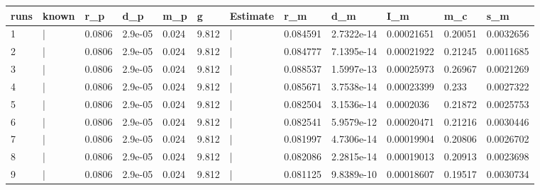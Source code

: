 \begin{tabular}{llllllllllll}
runs & known & r_p & d_p & m_p & g & Estimate & r_m & d_m & I_m & m_c & s_m \\ 
\hline 
1 & | & 0.0806 & 2.9e-05 & 0.024 & 9.812 & | & 0.084591 & 2.7322e-14 & 0.00021651 & 0.20051 & 0.0032656 \\ 
2 & | & 0.0806 & 2.9e-05 & 0.024 & 9.812 & | & 0.084777 & 7.1395e-14 & 0.00021922 & 0.21245 & 0.0011685 \\ 
3 & | & 0.0806 & 2.9e-05 & 0.024 & 9.812 & | & 0.088537 & 1.5997e-13 & 0.00025973 & 0.26967 & 0.0021269 \\ 
4 & | & 0.0806 & 2.9e-05 & 0.024 & 9.812 & | & 0.085671 & 3.7538e-14 & 0.00023399 & 0.233 & 0.0027322 \\ 
5 & | & 0.0806 & 2.9e-05 & 0.024 & 9.812 & | & 0.082504 & 3.1536e-14 & 0.0002036 & 0.21872 & 0.0025753 \\ 
6 & | & 0.0806 & 2.9e-05 & 0.024 & 9.812 & | & 0.082541 & 5.9579e-12 & 0.00020471 & 0.21216 & 0.0030446 \\ 
7 & | & 0.0806 & 2.9e-05 & 0.024 & 9.812 & | & 0.081997 & 4.7306e-14 & 0.00019904 & 0.20806 & 0.0026702 \\ 
8 & | & 0.0806 & 2.9e-05 & 0.024 & 9.812 & | & 0.082086 & 2.2815e-14 & 0.00019013 & 0.20913 & 0.0023698 \\ 
9 & | & 0.0806 & 2.9e-05 & 0.024 & 9.812 & | & 0.081125 & 9.8389e-10 & 0.00018607 & 0.19517 & 0.0030734 \\ 
\hline 
\end{tabular}